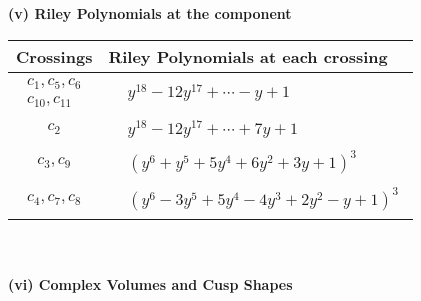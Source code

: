 \documentclass[1p]{elsarticle_modified}
\theoremstyle{definition}
\begin{document}
\newpage\renewcommand{\arraystretch}{1}
\flushleft \textbf{(v) Riley Polynomials at the component}\newline \\
\begin{tabular}{m{50pt}|m{274pt}}
Crossings & \hspace{64pt}Riley Polynomials at each crossing \\
\hline $$\begin{aligned}c_{1},c_{5},c_{6}\\c_{10},c_{11}\end{aligned}$$&$\begin{aligned}
&y^{18}-12 y^{17}+\cdots- y+1
\end{aligned}$\\
\hline $$\begin{aligned}c_{2}\end{aligned}$$&$\begin{aligned}
&y^{18}-12 y^{17}+\cdots+7 y+1
\end{aligned}$\\
\hline $$\begin{aligned}c_{3},c_{9}\end{aligned}$$&$\begin{aligned}
&(y^6+y^5+5 y^4+6 y^2+3 y+1)^3
\end{aligned}$\\
\hline $$\begin{aligned}c_{4},c_{7},c_{8}\end{aligned}$$&$\begin{aligned}
&(y^6-3 y^5+5 y^4-4 y^3+2 y^2- y+1)^3
\end{aligned}$\\
\hline
\end{tabular}\\~\\
\newpage\flushleft \textbf{(vi) Complex Volumes and Cusp Shapes}
\end{document}
